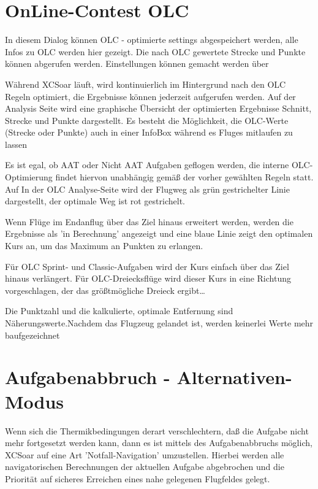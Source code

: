 \section{OnLine-Contest OLC}

In diesem Dialog können OLC - optimierte settings abgespeichert werden, alle Infos zu OLC werden hier gezeigt. Die nach OLC gewertete Strecke und Punkte können abgerufen werden. Einstellungen können gemacht werden über   

Während \textsf{XCSoar} läuft, wird kontinuierlich im Hintergrund nach den OLC Regeln optimiert, die Ergebnisse können  jederzeit  aufgerufen werden.
Auf der Analysis Seite wird eine graphische Übersicht der optimierten Ergebnisse Schnitt, Strecke und Punkte dargestellt.  Es besteht die Möglichkeit, die OLC-Werte (Strecke oder Punkte) auch in einer InfoBox während es Fluges mitlaufen zu lassen

Es ist egal, ob AAT oder Nicht AAT Aufgaben geflogen werden, die interne OLC-Optimierung findet hiervon unabhängig gemäß der vorher gewählten Regeln statt.  Auf In der OLC Analyse-Seite wird der Flugweg als grün gestrichelter Linie dargestellt, der optimale Weg ist rot gestrichelt.

Wenn Flüge im Endanflug über das Ziel hinaus erweitert werden, werden die Ergebnisse als 'in Berechnung' angezeigt und eine blaue Linie zeigt den optimalen Kurs an, um das Maximum an Punkten zu erlangen.

Für OLC Sprint- und Classic-Aufgaben wird der Kurs einfach über das Ziel hinaus verlängert.  Für OLC-Dreiecksflüge wird dieser Kurs in eine Richtung vorgeschlagen, der das größtmögliche Dreieck ergibt\dots

Die Punktzahl und die kalkulierte, optimale Entfernung sind Näherungswerte.Nachdem das Flugzeug gelandet ist, werden keinerlei Werte mehr baufgezeichnet

\section{Aufgabenabbruch - Alternativen-Modus}\label{sec:taskabort}

Wenn sich die Thermikbedingungen derart verschlechtern, daß die Aufgabe nicht mehr fortgesetzt werden kann,
dann es ist mittels des Aufgabenabbruchs möglich, \textsf{XCSoar} auf eine Art 'Notfall-Navigation' umzustellen.
Hierbei werden alle navigatorischen Berechnungen der aktuellen Aufgabe abgebrochen und die Priorität auf sicheres Erreichen eines nahe gelegenen Flugfeldes gelegt.

